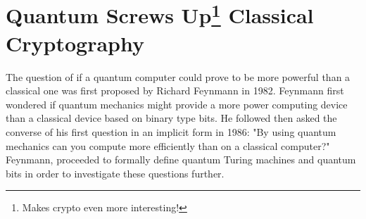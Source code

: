 \section{Quantum Screws Up\footnote{Makes crypto even more interesting!} Classical Cryptography} 


The question of if a quantum computer could prove to be more powerful than a classical one was first proposed by Richard Feynmann in 1982. Feynmann first wondered if quantum mechanics might provide a more power computing device than a classical device based on binary type bits. He followed then asked the converse of his first question in an implicit form in 1986: "By using quantum mechanics can you compute more efficiently than on a classical computer?" Feynmann, proceeded to formally define quantum Turing machines and quantum bits in order to investigate these questions further.





